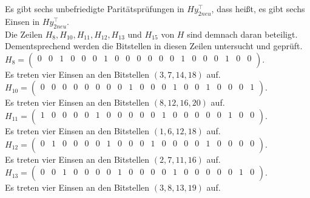 \begin{Beispiel}
    Es gibt sechs unbefriedigte Paritätsprüfungen in $Hy_{2neu}^\intercal$,
    dass hei\ss{}t, es gibt sechs Einsen in $Hy_{2neu}^\intercal.$\\
    Die Zeilen $H_8, H_{10}, H_{11}, H_{12}, H_{13}$ und $H_{15}$ von $H$ sind demnach daran beteiligt.\\ 
    Dementsprechend werden die Bitstellen in diesen Zeilen untersucht und geprüft.\\
    
    $H_8=\left( \begin{array}{rrrrrrrrrrrrrrrrrrrr}
        0 & 0 & 1 & 0 & 0 & 0 & 1 & 0 & 0 & 0 & 0 & 0 & 0 & 1 & 0 & 0 & 0 & 1 & 0 & 0 \\
       \end{array}\right). 
    $\\
    Es treten vier Einsen an den Bitstellen $(3, 7, 14, 18)$ auf.\\
    
    $H_{10}=\left( \begin{array}{rrrrrrrrrrrrrrrrrrrr}
        0 & 0 & 0 & 0 & 0 & 0 & 0 & 0 & 1 & 0 & 0 & 0 & 1 & 0 & 0 & 1 & 0 & 0 & 0 & 1 \\
       \end{array}\right). 
    $\\
    Es treten vier Einsen an den Bitstellen $(8, 12, 16, 20)$ auf.\\
    
    $H_{11}= \left( \begin{array}{rrrrrrrrrrrrrrrrrrrr}
        1 & 0 & 0 & 0 & 0 & 1 & 0 & 0 & 0 & 0 & 0 & 1 & 0 & 0 & 0 & 0 & 0 & 1 & 0 & 0 \\
       \end{array}\right). 
    $\\
    Es treten vier Einsen an den Bitstellen $(1, 6, 12, 18)$ auf.\\
    
    $H_{12}= \left( \begin{array}{rrrrrrrrrrrrrrrrrrrr}
        0 & 1 & 0 & 0 & 0 & 0 & 1 & 0 & 0 & 0 & 1 & 0 & 0 & 0 & 0 & 1 & 0 & 0 & 0 & 0 \\
       \end{array}\right). 
    $\\
    Es treten vier Einsen an den Bitstellen $(2, 7, 11, 16)$ auf.\\
    
    $H_{13}= \left( \begin{array}{rrrrrrrrrrrrrrrrrrrr}
        0 & 0 & 1 & 0 & 0 & 0 & 0 & 1 & 0 & 0 & 0 & 0 & 1 & 0 & 0 & 0 & 0 & 0 & 1 & 0 \\
       \end{array}\right). 
    $\\
    Es treten vier Einsen an den Bitstellen $(3, 8, 13, 19)$ auf.\\
    

\end{Beispiel}

